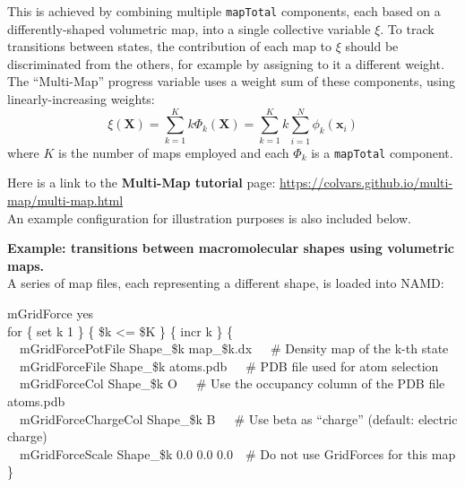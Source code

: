 {This is achieved by combining multiple \texttt{mapTotal} components, each based on a differently-shaped volumetric map, into a single collective variable $\xi$.
To track transitions between states, the contribution of each map to $\xi$ should be discriminated from the others, for example by assigning to it a different weight.
The ``Multi-Map'' progress variable \cite{Fiorin2020} uses a weight sum of these components, using linearly-increasing weights:
\begin{equation}
  \label{eq:cvc_multi_map}
    \xi\left(\mathbf{X}\right) = \sum_{k=1}^{K} k \Phi_{k}\left(\mathbf{X}\right) = \sum_{k=1}^{K} k \sum_{i=1}^{N}\phi_{k}\left(\mathbf{x}_{i}\right)
\end{equation}
\noindent{}where $K$ is the number of maps employed and each $\Phi_k$ is a \texttt{mapTotal} component.

Here is a link to the \textbf{Multi-Map tutorial} page: \url{https://colvars.github.io/multi-map/multi-map.html}\\
An example configuration for illustration purposes is also included below.

\noindent\textbf{Example: transitions between macromolecular shapes using volumetric maps.}\\
A series of map files, each representing a different shape, is loaded into NAMD:\\
\begin{mdexampleinput}
  \-mGridForce yes\\
  \-for \{ set k 1 \} \{ \$k <= \$K \} \{ incr k \} \{\\
  \-~~mGridForcePotFile Shape\_\$k map\_\$k.dx~~~\# Density map of the k-th state\\
  \-~~mGridForceFile Shape\_\$k atoms.pdb~~~\# PDB file used for atom selection\\
  \-~~mGridForceCol Shape\_\$k O~~~\# Use the occupancy column of the PDB file atoms.pdb\\
  \-~~mGridForceChargeCol Shape\_\$k B~~~\# Use beta as ``charge'' (default: electric charge)\\
  \-~~mGridForceScale Shape\_\$k 0.0 0.0 0.0~~\# Do not use GridForces for this map\\
  \-\}
\end{mdexampleinput}

}
